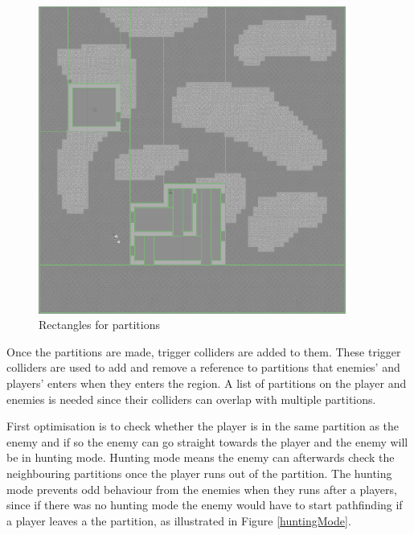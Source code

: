 \begin{figure}[H]
        \includegraphics[width=0.9\textwidth]{figures/generating_levels/partition_colliders.png}
    \caption{Rectangles for partitions}\label{fig:partition_colliders_on_map}
\end{figure}

Once the partitions are made, trigger colliders are added to them.
These trigger colliders are used to add and remove a reference to partitions that enemies' and players' enters when they enters the region.
A list of partitions on the player and enemies is needed since their colliders can overlap with multiple partitions.

First optimisation is to check whether the player is in the same partition as the enemy and if so the enemy can go straight towards the player and the enemy will be in hunting mode.
Hunting mode means the enemy can afterwards check the neighbouring partitions once the player runs out of the partition.
The hunting mode prevents odd behaviour from the enemies when they runs after a players, since if there was no hunting mode the enemy would have to start pathfinding if a player leaves a the partition, as illustrated in Figure \ref{huntingMode}.

